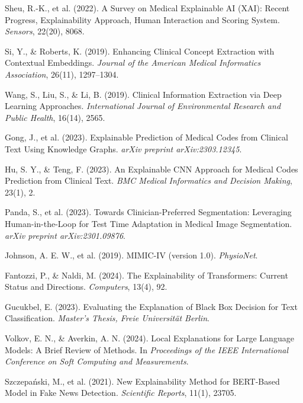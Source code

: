 \documentclass[10pt,a4paper]{article}
\begin{document}
\begin{thebibliography}{10}
\setlength{\itemsep}{0pt}

Sheu, R.-K., et al. (2022).
\newblock A Survey on Medical Explainable AI (XAI): Recent Progress, Explainability Approach, Human Interaction and Scoring System.
\newblock \textit{Sensors}, 22(20), 8068.

Si, Y., \& Roberts, K. (2019).
\newblock Enhancing Clinical Concept Extraction with Contextual Embeddings.
\newblock \textit{Journal of the American Medical Informatics Association}, 26(11), 1297–1304.

Wang, S., Liu, S., \& Li, B. (2019).
\newblock Clinical Information Extraction via Deep Learning Approaches.
\newblock \textit{International Journal of Environmental Research and Public Health}, 16(14), 2565.

Gong, J., et al. (2023).
\newblock Explainable Prediction of Medical Codes from Clinical Text Using Knowledge Graphs.
\newblock \textit{arXiv preprint arXiv:2303.12345}.

Hu, S. Y., \& Teng, F. (2023).
\newblock An Explainable CNN Approach for Medical Codes Prediction from Clinical Text.
\newblock \textit{BMC Medical Informatics and Decision Making}, 23(1), 2.

Panda, S., et al. (2023).
\newblock Towards Clinician-Preferred Segmentation: Leveraging Human-in-the-Loop for Test Time Adaptation in Medical Image Segmentation.
\newblock \textit{arXiv preprint arXiv:2301.09876}.

Johnson, A. E. W., et al. (2019).
\newblock MIMIC-IV (version 1.0).
\newblock \textit{PhysioNet}.

Fantozzi, P., \& Naldi, M. (2024).
\newblock The Explainability of Transformers: Current Status and Directions.
\newblock \textit{Computers}, 13(4), 92.

Gucukbel, E. (2023).
\newblock Evaluating the Explanation of Black Box Decision for Text Classification.
\newblock \textit{Master's Thesis, Freie Universität Berlin}.

Volkov, E. N., \& Averkin, A. N. (2024).
\newblock Local Explanations for Large Language Models: A Brief Review of Methods.
\newblock In \textit{Proceedings of the IEEE International Conference on Soft Computing and Measurements}.

Szczepański, M., et al. (2021).
\newblock New Explainability Method for BERT-Based Model in Fake News Detection.
\newblock \textit{Scientific Reports}, 11(1), 23705.

\end{thebibliography}
\end{document}
